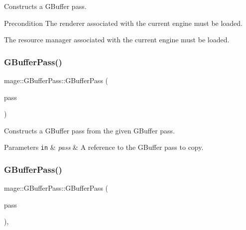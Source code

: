 Constructs a G\+Buffer pass.

\begin{DoxyPrecond}{Precondition}
The renderer associated with the current engine must be loaded. 

The resource manager associated with the current engine must be loaded. 
\end{DoxyPrecond}
\hypertarget{classmage_1_1_g_buffer_pass_aa3c72c660c790084af696a04bf732c8b}{}\label{classmage_1_1_g_buffer_pass_aa3c72c660c790084af696a04bf732c8b} 
\subsubsection{\texorpdfstring{G\+Buffer\+Pass()}{GBufferPass()}\hspace{0.1cm}{\footnotesize\ttfamily [2/3]}}
{\footnotesize\ttfamily mage\+::\+G\+Buffer\+Pass\+::\+G\+Buffer\+Pass (\begin{DoxyParamCaption}\item[{const \hyperlink{classmage_1_1_g_buffer_pass}{G\+Buffer\+Pass} \&}]{pass }\end{DoxyParamCaption})\hspace{0.3cm}{\ttfamily [delete]}}

Constructs a G\+Buffer pass from the given G\+Buffer pass.


\begin{DoxyParams}[1]{Parameters}
\mbox{\tt in}  & {\em pass} & A reference to the G\+Buffer pass to copy. \\
\hline
\end{DoxyParams}
\hypertarget{classmage_1_1_g_buffer_pass_a1de0f019c704ecefc8be4d4c5c151214}{}\label{classmage_1_1_g_buffer_pass_a1de0f019c704ecefc8be4d4c5c151214} 
\subsubsection{\texorpdfstring{G\+Buffer\+Pass()}{GBufferPass()}\hspace{0.1cm}{\footnotesize\ttfamily [3/3]}}
{\footnotesize\ttfamily mage\+::\+G\+Buffer\+Pass\+::\+G\+Buffer\+Pass (\begin{DoxyParamCaption}\item[{\hyperlink{classmage_1_1_g_buffer_pass}{G\+Buffer\+Pass} \&\&}]{pass }\end{DoxyParamCaption})\hspace{0.3cm}{\ttfamily [default]}, {\ttfamily [noexcept]}}

